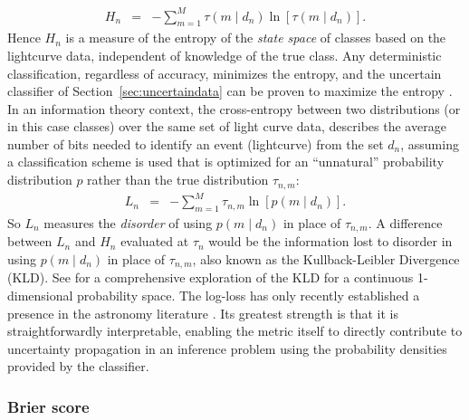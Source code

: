 \begin{eqnarray}
  \label{eq:entropy}
  H_{n} &=& -\sum_{m=1}^{M} \tau(m \mid d_{n}) \ln[\tau(m \mid d_{n})].
\end{eqnarray}
Hence $H_n$ is a measure of the entropy of the \textit{state space} of classes based on the lightcurve data, independent of knowledge of the true class. Any deterministic classification, regardless of accuracy, minimizes the entropy, and the uncertain classifier of Section~\ref{sec:uncertaindata} can be proven to maximize the entropy \citep{murphy_machine_2012}.
In an information theory context, the cross-entropy between two distributions (or in this case classes) over the same set of light curve data, describes the average number of bits needed to identify an event (lightcurve) from the set $d_n$, assuming a classification scheme is used that is optimized for an ``unnatural'' probability distribution $p$ rather than the true distribution $\tau_{n,m}$:
\begin{eqnarray}
  \label{eq:logloss}
  L_{n} &=& -\sum_{m=1}^{M}\tau_{n, m}\ln[p(m \mid d_{n})].
\end{eqnarray}
So $L_n$ measures the \textit{disorder} of using $p(m \mid d_{n})$ in place of $\tau_{n, m}$.
A difference between $L_{n}$ and $H_{n}$ evaluated at $\tau_{n}$ would be the information lost to disorder in using $p(m \mid d_{n})$ in place of $\tau_{n, m}$, also known as the Kullback-Leibler Divergence (KLD).
See \citet{malz_approximating_2018} for a comprehensive exploration of the KLD for a continuous 1-dimensional probability space.
The log-loss has only recently established a presence in the astronomy literature \citep{hon_deep_2017, hon_deep_2018}.
Its greatest strength is that it is straightforwardly interpretable, enabling the metric itself to directly contribute to uncertainty propagation in an inference problem using the probability densities provided by the classifier.

\subsubsection{Brier score}
\label{sec:brier}

